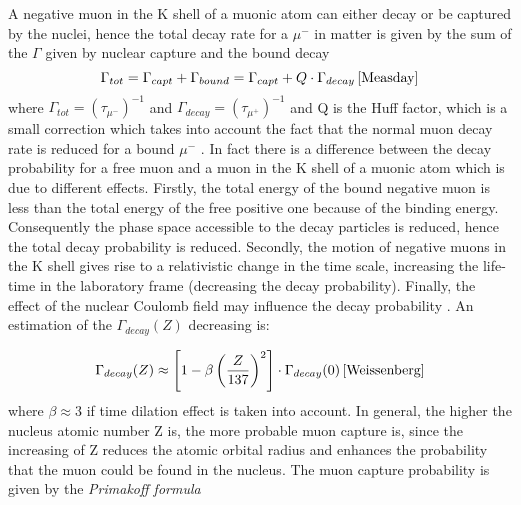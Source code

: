 \noindent A negative muon in the K shell of a muonic atom can either decay or be captured by the nuclei, hence the total decay rate for a $\mu^-$ in matter is given by the sum of the $\Gamma$ given by nuclear capture and the bound decay 
\begin{equation} \label{piripirlo}
	\Gamma_{tot} = \Gamma_{capt} + \Gamma_{bound} = \Gamma_{capt} +  Q \cdot \Gamma_{decay} \, \cite{Measday}
\end{equation}
where $\Gamma_{tot} = (\tau_{\mu^-})^{-1}$ and $\Gamma_{decay} = (\tau_{\mu^+})^{-1}$ and Q is the Huff factor, which is a small correction
which takes into account the fact that the normal muon decay rate is reduced for a bound $\mu^-$ \cite{Measday}. In fact there is a difference between the decay probability for a free muon and a muon in the K shell of a muonic atom which is due to different effects. Firstly, the total energy of the bound negative muon is less than the total energy of the free positive one because of the binding energy.
Consequently the phase space accessible to the decay particles is reduced, hence the total decay probability is reduced. Secondly, the motion of negative muons in the K shell gives rise to a relativistic change in the time scale, increasing the life-time in the laboratory frame (decreasing the decay probability). Finally, the effect of the nuclear Coulomb field may influence the decay probability \cite{Weissenberg}.
An estimation of the $\Gamma_{decay}(Z)$ decreasing is:

\begin{equation}
	\Gamma_{decay}(Z) \approx \left[ 1 - \beta \left( \frac{Z}{137} \right)^2 \right] \cdot \Gamma_{decay} (0) \, \cite{Weissenberg}
\end{equation}
where $\beta \approx 3$ if  time dilation effect is taken into account. 
In general, the higher the nucleus atomic number Z is, the more probable muon capture is, since the increasing of Z reduces the atomic orbital radius and
enhances the probability that the muon could be found in the nucleus.
The muon capture probability is given by the \emph{Primakoff formula} 

